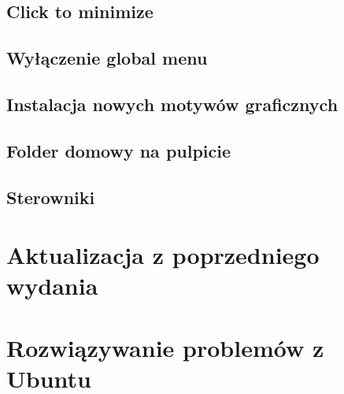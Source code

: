 \documentclass[a4paper,11pt,oneside]{mwart}
\begin{document}
	\subsection{Click to minimize}
	\subsection{Wyłączenie global menu}
	\subsection{Instalacja nowych motywów graficznych}
	\subsection{Folder domowy na pulpicie}
	\subsection{Sterowniki}
	\label{sterowniki}
\section{Aktualizacja z poprzedniego wydania}
\section{Rozwiązywanie problemów z Ubuntu}
\end{document}
